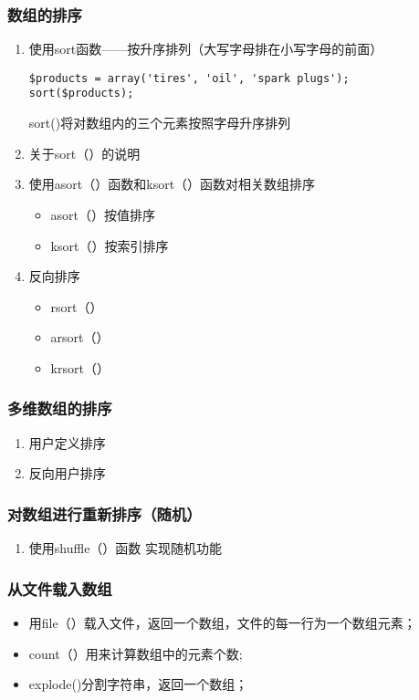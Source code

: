 \documentclass[11pt]{article}
\begin{document}
\subsubsection{数组的排序}
\label{sec:orgcfee0a0}
\begin{enumerate}
\item 使用sort函数——按升序排列（大写字母排在小写字母的前面）
\label{sec:orgedbc3c0}
\begin{verbatim}
$products = array('tires', 'oil', 'spark plugs');
sort($products);
\end{verbatim}
sort()将对数组内的三个元素按照字母升序排列
\item 关于sort（）的说明
\label{sec:orgda4d7f2}
\item 使用asort（）函数和ksort（）函数对相关数组排序
\label{sec:org9707b3d}
\begin{itemize}
\item asort（）按值排序
\item ksort（）按索引排序
\end{itemize}
\item 反向排序
\label{sec:org4b83b31}
\begin{itemize}
\item rsort（）
\item arsort（）
\item krsort（）
\end{itemize}
\end{enumerate}
\subsubsection{多维数组的排序}
\label{sec:org75168f3}
\begin{enumerate}
\item 用户定义排序
\label{sec:orgea4a1e9}
\item 反向用户排序
\label{sec:org9957029}
\end{enumerate}
\subsubsection{对数组进行重新排序（随机）}
\label{sec:orgd9f281c}
\begin{enumerate}
\item 使用shuffle（）函数
\label{sec:org035c903}
实现随机功能
\end{enumerate}
\subsubsection{从文件载入数组}
\label{sec:org80264fa}
\begin{itemize}
\item 用file（）载入文件，返回一个数组，文件的每一行为一个数组元素；
\item count（）用来计算数组中的元素个数;
\item explode()分割字符串，返回一个数组；
\end{itemize}
\end{document}

